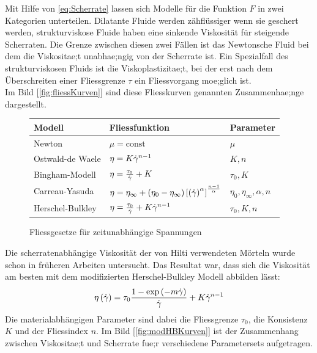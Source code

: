 Mit Hilfe von \eqref{eq:Scherrate} lassen sich Modelle für die Funktion $F$ in zwei Kategorien unterteilen. Dilatante Fluide werden zähflüssiger wenn sie geschert werden, strukturviskose Fluide haben eine sinkende Viskosität für steigende Scherraten. 
Die Grenze zwischen diesen zwei Fällen ist das Newtonsche Fluid bei dem die Viskositae;t unabhae;ngig von der Scherrate ist. 
Ein Spezialfall des strukturviskosen Fluids ist die Viskoplastizitae;t, bei der erst nach dem Überschreiten einer Fliessgrenze $\tau$ ein Fliessvorgang moe;glich ist.\\
Im Bild [\ref{fig:fliessKurven}]  sind diese Fliesskurven genannten Zusammenhae;nge dargestellt.
%
\begin{figure}
    \centering
    \begin{tabular}{l l l}
        Modell & Fliessfunktion & Parameter \\
        \hline
        Newton & $\mu= \mbox{const}$ & $\mu$ \\ 
        Ostwald-de Waele & $\eta=K \dot\gamma^{n-1}$ & $K,n$ \\ 
        Bingham-Modell & $\eta= \frac{\tau_0}{\dot\gamma}+K $ & $\tau_0,K$ \\ 
        Carreau-Yasuda & $\eta=\eta_\infty+\left( \eta_0-\eta_\infty \right)\left[ \left( \dot\gamma \right)^\alpha \right] ^{\frac{n-1}{\alpha}} $ & $\eta_0,\eta_\infty,\alpha,n$ \\ 
        Herschel-Bulkley & $\eta= \frac{\tau_0}{\dot\gamma}+K\dot\gamma^{n-1} $ & $\tau_0,K,n$ \\ 
        
        
    \end{tabular}
    \caption{Fliessgesetze für zeitunabhängige Spannungen}
    \label{tab:Fliessgesetze}
\end{figure}
%

Die scherratenabhängige Viskosität der von Hilti verwendeten Mörteln wurde schon in früheren Arbeiten untersucht. Das Resultat war, dass sich die Viskosität am besten mit dem modifizierten Herschel-Bulkley Modell abbilden lässt:
\begin{equation}
    \label{eq:modHB}
    \eta\left( \dot\gamma \right) = \tau_0 \frac{1-\exp \left( -m\dot\gamma \right)}{\dot\gamma}+K\dot\gamma^{n-1}
\end{equation}
Die materialabhängigen Parameter sind dabei die Fliessgrenze $\tau_0$, die Konsistenz $K$ und der Fliessindex $n$. Im Bild [\ref{fig:modHBKurven}]  ist der Zusammenhang zwischen Viskositae;t und Scherrate fue;r verschiedene Parametersets aufgetragen.

